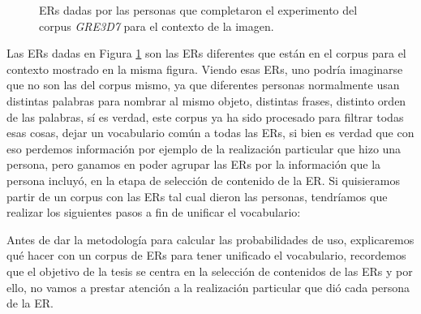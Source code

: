\begin{figure}[H]
\begin{minipage}[b]{0.5\linewidth}
{%
}
\end{minipage}
\caption{ERs dadas por las personas que completaron el experimento del corpus \textit{GRE3D7} para el contexto de la imagen.}\label{fig4-4}
\end{figure}
Las ERs dadas en Figura \ref{fig4-4} son las ERs diferentes que est\'an en el corpus para el contexto mostrado en la misma figura. Viendo esas ERs, uno podr\'ia imaginarse que no son las del corpus mismo, ya que diferentes personas normalmente usan distintas palabras para nombrar al mismo objeto, distintas frases, distinto orden de las palabras, s\'i es verdad, este corpus ya ha sido procesado para filtrar todas esas cosas, dejar un vocabulario com\'un a todas las ERs, si bien es verdad que con eso perdemos informaci\'on por ejemplo de la realizaci\'on particular que hizo una persona, pero ganamos en poder agrupar las ERs por la informaci\'on que la persona incluy\'o, en la etapa de selecci\'on de contenido de la ER. Si quisieramos partir de un corpus con las ERs tal cual dieron las personas, tendr\'iamos que realizar los siguientes pasos a fin de unificar el vocabulario:

Antes de dar la metodolog\'ia para calcular las probabilidades de uso, explicaremos qu\'e hacer con un corpus de ERs para tener unificado el vocabulario, recordemos que el objetivo de la tesis se centra en la selecci\'on de contenidos de las ERs y por ello, no vamos a prestar atenci\'on a la realizaci\'on particular que di\'o cada persona de la ER. 

